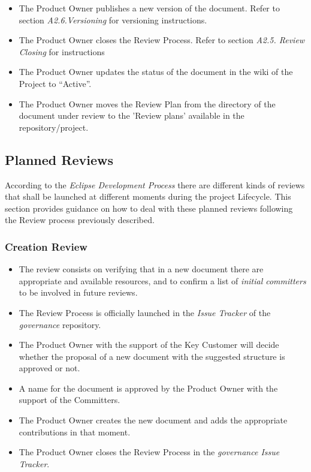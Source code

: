 \documentclass{template/openetcs_article}
\begin{document}
\begin{itemize}
\item The Product Owner publishes a new version of the document. Refer to section {\it A2.6.Versioning} for versioning instructions.
\item The Product Owner closes the Review Process. Refer to section {\it A2.5. Review Closing} for instructions 
\item The Product Owner updates the status of the document in the wiki of the Project to “Active”.
\item The Product Owner moves the Review Plan from the directory of the document under review to the 'Review plans' available in the repository/project.
\end{itemize}

\subsection{Planned Reviews}\label{PlannedReviews}

According to the {\it Eclipse Development Process} there are different kinds of reviews that shall be launched at different moments during the project Lifecycle. This section provides guidance on how to deal with these planned reviews following the Review process previously described.

\subsubsection{Creation Review}
\begin{itemize}
\item The review consists on verifying that in a new document there are appropriate and available resources, and to confirm a list of {\it initial committers} to be involved in future reviews. 
\item The Review Process is officially launched in the {\it Issue Tracker} of the {\it governance} repository.
\item The Product Owner with the support of the Key Customer will decide whether the proposal of a new document with the suggested structure is approved or not.
\item A name for the document is approved by the Product Owner with the support of the Committers.
\item The Product Owner creates the new document and adds the appropriate contributions in that moment. 
\item The Product Owner closes the Review Process in the {\it governance Issue Tracker}.
\end{itemize}
\end{document}
